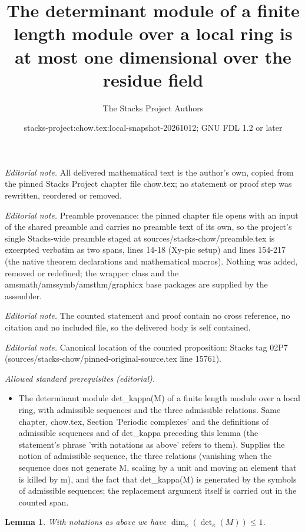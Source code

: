 \documentclass[10pt,a4paper]{amsart}
\title{The determinant module of a finite length module over a local ring is at most one dimensional over the residue field}
\author{The Stacks Project Authors}
\date{stacks-project:chow.tex:local-snapshot-20261012; GNU FDL 1.2 or later}
\theoremstyle{plain}
\newtheorem{lemma}[subsection]{Lemma}
\theoremstyle{definition}
\theoremstyle{remark}
\numberwithin{equation}{subsection}
\begin{document}
\maketitle
\noindent\textit{Editorial note.} All delivered mathematical text is the author's own, copied from the pinned Stacks Project chapter file chow.tex; no statement or proof step was rewritten, reordered or removed.\par\medskip
\noindent\textit{Editorial note.} Preamble provenance: the pinned chapter file opens with an input of the shared preamble and carries no preamble text of its own, so the project's single Stacks-wide preamble staged at sources/stacks-chow/preamble.tex is excerpted verbatim as two spans, lines 14-18 (Xy-pic setup) and lines 154-217 (the native theorem declarations and mathematical macros). Nothing was added, removed or redefined; the wrapper class and the amsmath/amssymb/amsthm/graphicx base packages are supplied by the assembler.\par\medskip
\noindent\textit{Editorial note.} The counted statement and proof contain no cross reference, no citation and no included file, so the delivered body is self contained.\par\medskip
\noindent\textit{Editorial note.} Canonical location of the counted proposition: Stacks tag 02P7 (sources/stacks-chow/pinned-original-source.tex line 15761).\par\medskip
\noindent\textit{Allowed standard prerequisites (editorial).}\begin{itemize}
\item The determinant module det\_kappa(M) of a finite length module over a local ring, with admissible sequences and the three admissible relations. Same chapter, chow.tex, Section 'Periodic complexes' and the definitions of admissible sequences and of det\_kappa preceding this lemma (the statement's phrase 'with notations as above' refers to them). Supplies the notion of admissible sequence, the three relations (vanishing when the sequence does not generate M, scaling by a unit and moving an element that is killed by m), and the fact that det\_kappa(M) is generated by the symbols of admissible sequences; the replacement argument itself is carried out in the counted span.
\end{itemize}\medskip
\begin{lemma}
\label{lemma-dimension-at-most-one}
With notations as above we have $\dim_\kappa(\det_\kappa(M)) \leq 1$.
\end{lemma}
\end{document}
